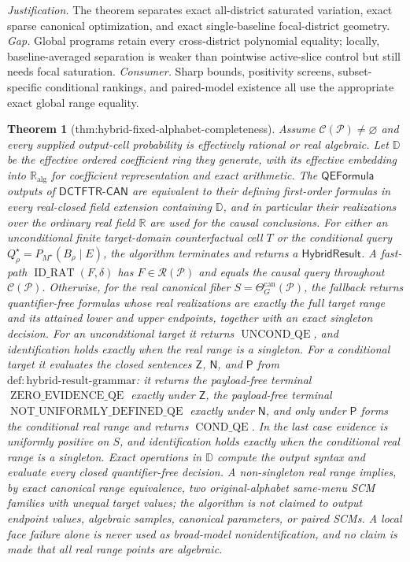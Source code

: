\documentclass{article}
\newtheorem{theorem}{Theorem}
\begin{document}
\par\smallskip\noindent \textit{Justification.} The theorem separates exact all-district saturated variation, exact sparse canonical optimization, and exact single-baseline focal-district geometry. \textit{Gap.} Global programs retain every cross-district polynomial equality; locally, baseline-averaged separation is weaker than pointwise active-slice control but still needs focal saturation. \textit{Consumer.} Sharp bounds, positivity screens, subset-specific conditional rankings, and paired-model existence all use the appropriate exact global range equality.

\begin{theorem}[thm:hybrid-fixed-alphabet-completeness]\label{thm:hybrid-fixed-alphabet-completeness}
Assume \(\mathcal C(\mathcal P)\ne\varnothing\) and every supplied output-cell probability is effectively rational or real algebraic.  Let \(\mathbb D\) be the effective ordered coefficient ring they generate, with its effective embedding into \(\mathbb R_{\mathrm{alg}}\) for coefficient representation and exact arithmetic.  The \(\mathsf{QEFormula}\) outputs of \(\mathsf{DCTFTR\text{-}CAN}\) are equivalent to their defining first-order formulas in every real-closed field extension containing \(\mathbb D\), and in particular their realizations over the ordinary real field \(\mathbb R\) are used for the causal conclusions.  For either an unconditional finite target-domain counterfactual cell \(T\) or the conditional query \(Q_\rho^\star=P_{M^\star}(B_\rho\mid E)\), the algorithm terminates and returns a \(\mathsf{HybridResult}\).  A fast-path \(\operatorname{ID\_RAT}(F,\delta)\) has \(F\in\mathscr R(\mathcal P)\) and equals the causal query throughout \(\mathcal C(\mathcal P)\).  Otherwise, for the real canonical fiber \(S=\Theta_G^{\mathrm{can}}(\mathcal P)\), the fallback returns quantifier-free formulas whose real realizations are exactly the full target range and its attained lower and upper endpoints, together with an exact singleton decision.  For an unconditional target it returns \(\operatorname{UNCOND\_QE}\), and identification holds exactly when the real range is a singleton.  For a conditional target it evaluates the closed sentences \(\mathsf Z\), \(\mathsf N\), and \(\mathsf P\) from \(\mathrm{def:hybrid\text{-}result\text{-}grammar}\): it returns the payload-free terminal \(\operatorname{ZERO\_EVIDENCE\_QE}\) exactly under \(\mathsf Z\), the payload-free terminal \(\operatorname{NOT\_UNIFORMLY\_DEFINED\_QE}\) exactly under \(\mathsf N\), and only under \(\mathsf P\) forms the conditional real range and returns \(\operatorname{COND\_QE}\).  In the last case evidence is uniformly positive on \(S\), and identification holds exactly when the conditional real range is a singleton.  Exact operations in \(\mathbb D\) compute the output syntax and evaluate every closed quantifier-free decision.  A non-singleton real range implies, by exact canonical range equivalence, two original-alphabet same-menu SCM families with unequal target values; the algorithm is not claimed to output endpoint values, algebraic samples, canonical parameters, or paired SCMs.  A local face failure alone is never used as broad-model nonidentification, and no claim is made that all real range points are algebraic.
\end{theorem}
\end{document}
